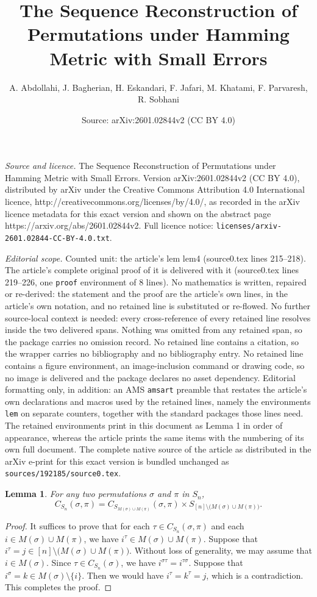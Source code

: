 \documentclass[10pt,a4paper]{amsart}
\title{The Sequence Reconstruction of Permutations under Hamming Metric with Small Errors}
\author{A. Abdollahi, J. Bagherian, H. Eskandari, F. Jafari, M. Khatami, F. Parvaresh, R. Sobhani}
\date{Source: arXiv:2601.02844v2 (CC BY 4.0)}
\newtheorem{lem}{Lemma}
\begin{document}
\maketitle

\noindent\emph{Source and licence.} The Sequence Reconstruction of Permutations under Hamming Metric with Small Errors. Version arXiv:2601.02844v2 (CC BY 4.0), distributed by arXiv under the Creative Commons Attribution 4.0 International licence, http://creativecommons.org/licenses/by/4.0/, as recorded in the arXiv licence metadata for this exact version and shown on the abstract page https://arxiv.org/abs/2601.02844v2. Full licence notice: \texttt{licenses/arxiv-2601.02844-CC-BY-4.0.txt}.\par\smallskip

\noindent\textit{Editorial scope.} Counted unit: the article's lem lem4 (source0.tex lines 215--218). The article's complete original proof of it is delivered with it (source0.tex lines 219--226, one \texttt{proof} environment of 8 lines). No mathematics is written, repaired or re-derived: the statement and the proof are the article's own lines, in the article's own notation, and no retained line is substituted or re-flowed.  No further source-local context is needed: every cross-reference of every retained line resolves inside the two delivered spans.  Nothing was omitted from any retained span, so the package carries no omission record.  No retained line contains a citation, so the wrapper carries no bibliography and no bibliography entry.  No retained line contains a figure environment, an image-inclusion command or drawing code, so no image is delivered and the package declares no asset dependency.  Editorial formatting only, in addition: an AMS \texttt{amsart} preamble that restates the article's own declarations and macros used by the retained lines, namely the environments \texttt{lem} on separate counters, together with the standard packages those lines need.  The retained environments print in this document as Lemma 1 in order of appearance, whereas the article prints the same items with the numbering of its own full document.  The complete native source of the article as distributed in the arXiv e-print for this exact version is bundled unchanged as \texttt{sources/192185/source0.tex}.
\begin{lem}\label{lem4}
	For any two permutations $\sigma$ and $\pi$ in $S_n$, $$C_{S_n}(\sigma, \pi)=C_{S_{M(\sigma)\cup M(\pi)}}(\sigma,\pi) \times 
		S_{[n] \setminus \big( M(\sigma) \cup M(\pi) \big)}.$$
\end{lem}

\begin{proof}
It suffices to prove that for each $\tau \in C_{S_n}(\sigma, \pi)$ and each $i \in M(\sigma) \cup M(\pi)$, we have $i^\tau \in M(\sigma) \cup M(\pi)$. 
Suppose  that $i^\tau = j \in [n] \setminus \big( M(\sigma) \cup M(\pi) \big)$. Without loss of generality, we may assume that  $i\in M(\sigma)$.
Since $\tau \in C_{S_n}(\sigma)$, we have $i^{\sigma\tau} = i^{\tau\sigma}$. 
Suppose that $i^\sigma = k \in M(\sigma) \setminus \{i\}$. 
Then we would have $i^{\tau} = k^\tau = j$, which is a contradiction. 
This completes the proof.
\end{proof}
\end{document}
